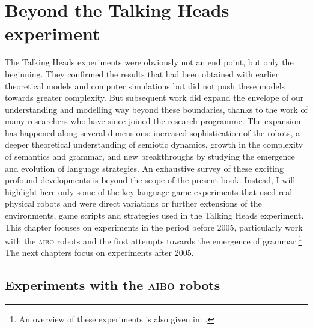 \chapter{Beyond the Talking Heads experiment}
\label{c:postscriptum}
\setcounter{foot}{1}

The Talking Heads experiments were obviously not an end point, but only the beginning. They confirmed the results that 
had been obtained with earlier theoretical models and computer simulations but did not push these models 
towards greater complexity. But subsequent work did expand the envelope of our understanding and modelling way  
beyond these boundaries, thanks to the work of many researchers who have since joined the research programme. 
The expansion has happened along several dimensions: increased sophistication of the robots, a deeper theoretical 
understanding of semiotic dynamics, growth in the complexity of semantics and grammar, and new breakthroughs by 
studying the emergence and evolution of language strategies. An exhaustive survey of these exciting profound developments 
is beyond the scope of the present book. Instead, I will highlight here only some of the key language game experiments that 
used real physical robots and were direct variations or further extensions of the environments, game scripts
and strategies used in the Talking Heads experiment. This chapter focuses on experiments 
in the period before 2005, particularly work with the \textsc{aibo} robots and the first attempts towards the emergence 
of grammar.\footnote{An overview of these experiments is also given in: \cite{Steels:2005}.}
The next chapters focus on experiments after 2005. 

\section{Experiments with the \textsc{aibo} robots} 


